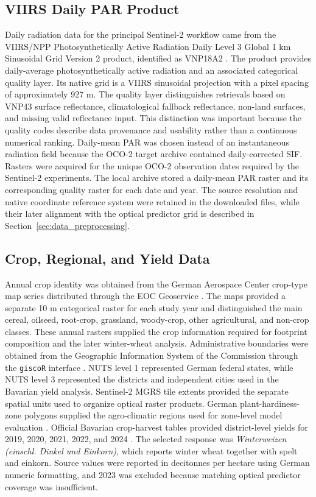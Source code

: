 \subsection{VIIRS Daily PAR Product}

Daily radiation data for the principal Sentinel-2 workflow came from the VIIRS/NPP Photosynthetically Active Radiation Daily Level 3 Global 1 km Sinusoidal Grid Version 2 product, identified as VNP18A2 \cite{wang_vnp18a2_2025}. The product provides daily-average photosynthetically active radiation and an associated categorical quality layer. Its native grid is a VIIRS sinusoidal projection with a pixel spacing of approximately 927 m. The quality layer distinguishes retrievals based on VNP43 surface reflectance, climatological fallback reflectance, non-land surfaces, and missing valid reflectance input. This distinction was important because the quality codes describe data provenance and usability rather than a continuous numerical ranking. Daily-mean PAR was chosen instead of an instantaneous radiation field because the OCO-2 target archive contained daily-corrected SIF. Rasters were acquired for the unique OCO-2 observation dates required by the Sentinel-2 experiments. The local archive stored a daily-mean PAR raster and its corresponding quality raster for each date and year. The source resolution and native coordinate reference system were retained in the downloaded files, while their later alignment with the optical predictor grid is described in Section~\ref{sec:data_preprocessing}.

\subsection{Crop, Regional, and Yield Data}

Annual crop identity was obtained from the German Aerospace Center crop-type map series distributed through the EOC Geoservice \cite{asam_crop_2022,gessner_crop_2025}. The maps provided a separate 10 m categorical raster for each study year and distinguished the main cereal, oilseed, root-crop, grassland, woody-crop, other agricultural, and non-crop classes. These annual rasters supplied the crop information required for footprint composition and the later winter-wheat analysis. Administrative boundaries were obtained from the Geographic Information System of the Commission through the \texttt{giscoR} interface \cite{gisco_nuts}. NUTS level 1 represented German federal states, while NUTS level 3 represented the districts and independent cities used in the Bavarian yield analysis. Sentinel-2 MGRS tile extents provided the separate spatial units used to organize optical raster products. German plant-hardiness-zone polygons supplied the agro-climatic regions used for zone-level model evaluation \cite{germany_hardiness_zones}. Official Bavarian crop-harvest tables provided district-level yields for 2019, 2020, 2021, 2022, and 2024 \cite{bavaria_harvest_statistics}. The selected response was \emph{Winterweizen (einschl. Dinkel und Einkorn)}, which reports winter wheat together with spelt and einkorn. Source values were reported in decitonnes per hectare using German numeric formatting, and 2023 was excluded because matching optical predictor coverage was insufficient.

